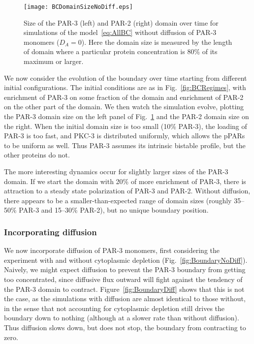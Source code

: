 \documentclass[11pt]{article}
\newcommand{\6}[1]{#1_{\text{6}}}
\newcommand{\3}[1]{#1_{\text{3}}}
\begin{document}
\begin{figure}
\centering
\texttt{[image: BCDomainSizeNoDiff.eps]}
\caption{\label{fig:BCDSNoD} Size of the PAR-3 (left) and PAR-2 (right) domain over time for simulations of the model\ \eqref{eq:AllBC} without diffusion of PAR-3 monomers ($D_A=0$). Here the domain size is measured by the length of domain where a particular protein concentration is 80\% of its maximum or larger. }
\end{figure}

We now consider the evolution of the boundary over time starting from different initial configurations. The initial conditions are as in Fig.\ \ref{fig:BCRegimes}, with enrichment of PAR-3 on some fraction of the domain and enrichment of PAR-2 on the other part of the domain. We then watch the simulation evolve, plotting the PAR-3 domain size on the left panel of Fig.\ \ref{fig:BCDSNoD} and the PAR-2 domain size on the right. When the initial domain size is too small (10\% PAR-3), the loading of PAR-3 is too fast, and PKC-3 is distributed uniformly, which allows the pPARs to be uniform as well. Thus PAR-3 assumes its intrinsic bistable profile, but the other proteins do not.

The more interesting dynamics occur for slightly larger sizes of the PAR-3 domain. If we start the domain with 20\% of more enrichment of PAR-3, there is attraction to a steady state polarization of PAR-3 and PAR-2. Without diffusion, there appears to be a smaller-than-expected range of domain sizes (roughly 35--50\% PAR-3 and 15--30\% PAR-2), but no unique boundary position.


\subsubsection{Incorporating diffusion}
We now incorporate diffusion of PAR-3 monomers, first considering the experiment with and without cytoplasmic depletion (Fig.\ \ref{fig:BoundaryNoDiff}). Naively, we might expect diffusion to prevent the PAR-3 boundary from getting too concentrated, since diffusive flux outward will fight against the tendency of the PAR-3 domain to contract. Figure\ \ref{fig:BoundaryDiff} shows that this is not the case, as the simulations with diffusion are almost identical to those without, in the sense that not accounting for cytoplasmic depletion still drives the boundary down to nothing (although at a slower rate than without diffusion). Thus diffusion slows down, but does not stop, the boundary from contracting to zero. 
\end{document}
